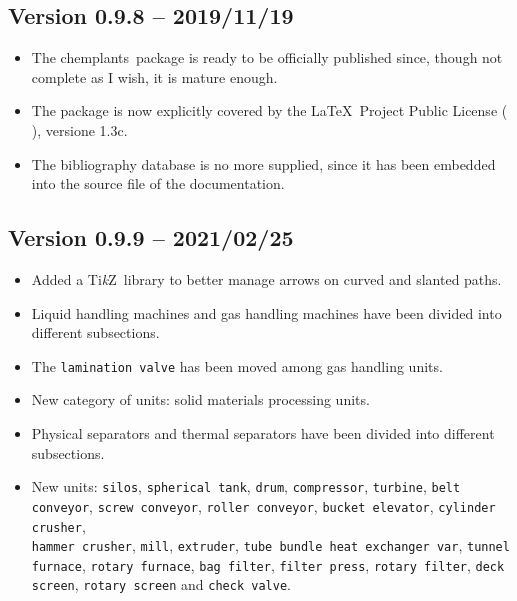 \documentclass[12pt]{article}						%
\newcommand*{\ac}[1]{%
		\textsmaller{#1}%
	}
\newcommand*{\chpp}[1]{\texttt{#1}}				%
\newcommand*{\chemplants}{chemplants}
\newcommand*{\TikZ}{Ti\textit{k}Z}
\begin{document}
\subsection*{Version 0.9.8 -- 2019/11/19}

\begin{itemize}
	\item The \chemplants\ package is ready to be officially published since,
		though not complete as I wish, it is mature enough.
	\item The package is now explicitly covered by the \LaTeX\ Project Public
		License (\ac{LPPL}), versione 1.3c.
	\item The bibliography database is no more supplied, since it has been
		embedded into the source file of the documentation.
\end{itemize}

\subsection*{Version 0.9.9 -- 2021/02/25}

\begin{itemize}
	\item Added a \TikZ\ library to better manage arrows on curved and slanted
		paths.
	\item Liquid handling machines and gas handling machines have been divided
		into different subsections.
	\item The \chpp{lamination valve} has been moved among gas handling units.
	\item New category of units: solid materials processing units.
	\item Physical separators and thermal separators have been divided into
		different subsections.
	\item New units: \chpp{silos}, \chpp{spherical tank}, \chpp{drum},
		\chpp{compressor}, \chpp{turbine}, \chpp{belt conveyor},
		\chpp{screw conveyor}, \chpp{roller conveyor}, \chpp{bucket elevator},
		\chpp{cylinder crusher},\\
		\chpp{hammer crusher}, \chpp{mill}, \chpp{extruder},
		\chpp{tube bundle heat exchanger var}, \chpp{tunnel furnace},
		\chpp{rotary furnace}, \chpp{bag filter}, \chpp{filter press},
		\chpp{rotary filter}, \chpp{deck screen}, \chpp{rotary screen} and
		\chpp{check valve}.
\end{itemize}

\end{document}
